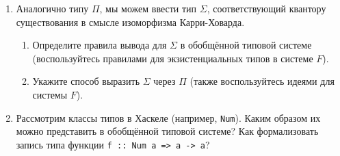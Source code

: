\documentclass[10pt,a4paper,oneside]{article}
\begin{document}
\begin{enumerate}
\item Аналогично типу $\Pi$, мы можем ввести тип $\Sigma$, соответствующий квантору существования
в смысле изоморфизма Карри-Ховарда. 
\begin{enumerate}
\item Определите правила вывода для $\Sigma$ в обобщённой типовой системе (воспользуйтесь правилами
для экзистенциальных типов в системе $F$).
\item Укажите способ выразить $\Sigma$ через $\Pi$ (также воспользуйтесь идеями для системы $F$).
\end{enumerate}

\item Рассмотрим классы типов в Хаскеле (например, \verb!Num!). Каким образом их можно представить в обобщённой
типовой системе? Как формализовать запись типа функции \verb!f :: Num a => a -> a!?
\end{enumerate}
\end{document}

